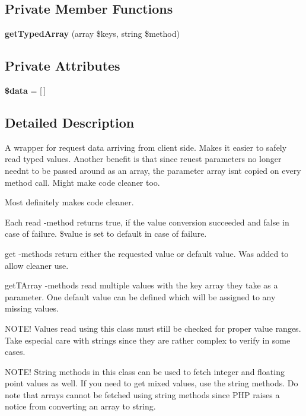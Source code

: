 \subsection*{Private Member Functions}
\begin{DoxyCompactItemize}
\item 
\textbf{ get\+Typed\+Array} (array \$keys, string \$method)
\end{DoxyCompactItemize}
\subsection*{Private Attributes}
\begin{DoxyCompactItemize}
\item 
\mbox{\label{class_request_data_a6efc15b5a2314dd4b5aaa556a375c6d6}} 
{\bfseries \$data} = [$\,$]
\end{DoxyCompactItemize}


\subsection{Detailed Description}
A wrapper for request data arriving from client side. Makes it easier to safely read typed values. Another benefit is that since reuest parameters no longer needn\textquotesingle{}t to be passed around as an array, the parameter array isn\textquotesingle{}t copied on every method call. Might make code cleaner too.
\begin{DoxyItemize}
\item Most definitely makes code cleaner.
\end{DoxyItemize}

Each read -\/method returns true, if the value conversion succeeded and false in case of failure. \$value is set to default in case of failure.

get -\/methods return either the requested value or default value. Was added to allow cleaner use.

get\+T\+Array -\/methods read multiple values with the key array they take as a parameter. One default value can be defined which will be assigned to any missing values.

N\+O\+T\+E! Values read using this class must still be checked for proper value ranges. Take especial care with strings since they are rather complex to verify in some cases.

N\+O\+T\+E! String methods in this class can be used to fetch integer and floating point values as well. If you need to get mixed values, use the string methods. Do note that arrays cannot be fetched using string methods since P\+HP raises a notice from converting an array to string.


